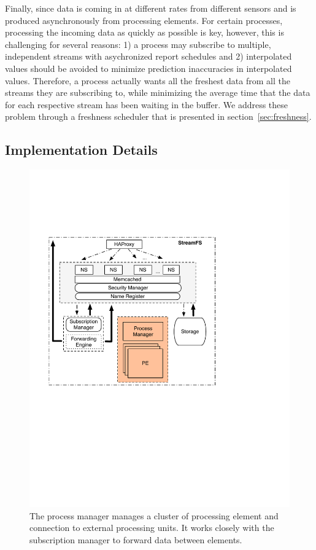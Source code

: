 Finally, since data is coming in at different rates from different sensors and is produced asynchronously from processing elements.
For certain processes, processing the incoming data as quickly as possible is key, however, this is challenging for several reasons:
1) a process may subscribe to multiple, independent streams with asychronized report schedules and 2) interpolated values
should be avoided to minimize prediction inaccuracies in interpolated values.  Therefore, a process actually wants all the freshest
data from all the streams they are subscribing to, while minimizing the average time that the data for each respective stream has 
been waiting in the buffer.  We address these problem through a freshness scheduler that is presented in section~\ref{sec:freshness}.



\subsection{Implementation Details}

\begin{figure}[h!] %
\centering
\includegraphics[width=.55\columnwidth]{figs/procmngr}
\caption{The process manager manages a cluster of processing element and connection to external processing units.  It works
closely with the subscription manager to forward data between elements.}
\label{fig:procmngr}
\end{figure}


